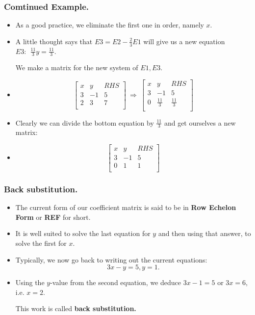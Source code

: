 
\begin{frame}%
  \frametitle{Comtinued Example.}
  \begin{itemize}%

\item
As a good practice, we eliminate the first one in order, namely $x$.

\item A little thought says that $E3=E2-\frac{2}{3}E1$ will give us a new
equation $E3:~~\frac{11}{3}y = \frac{11}{3}$.

We make a matrix for the new system of $E1,E3$.

\item
$$\left[
\begin{array}{rr|l}
x & y & RHS \\
3 & -1 & 5 \\
2 & 3 & 7 \\
\end{array}
\right]
~\Rightarrow ~
\left[
\begin{array}{rr|l}
x & y & RHS \\
3 & -1 & 5 \\
0 & \frac{11}{3} & \frac{11}{3} \\
\end{array}
\right]
$$

\item Clearly we can divide the bottom equation by $\frac{11}{3}$ and
get ourselves a new matrix:

\item
$$\left[
\begin{array}{rr|l}
x & y & RHS \\
3 & -1 & 5 \\
0 & 1 & 1 \\
\end{array}
\right]
$$

\end{itemize}
\end{frame}

\begin{frame}%
  \frametitle{Back substitution.}
  \begin{itemize}%
\item The current form of our coefficient matrix is said to be in {\bf Row Echelon Form}
or {\bf REF} for short.

\item It is well suited to solve the last equation for $y$ and then
using that answer, to solve the first for $x$.

\item Typically, we now go back to writing out the current equations:
$$3x-y=5, y=1.$$

\item Using the $y$-value from the second equation, we deduce $3x-1=5$ or
$3x=6$, i.e. $x=2$.

This work is called {\bf back substitution.}

\end{itemize}
\end{frame}

